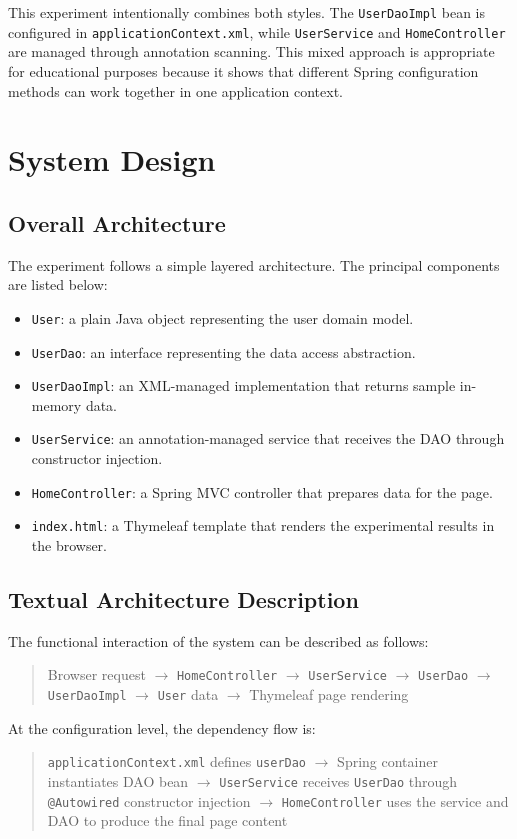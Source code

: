 \documentclass[12pt,a4paper]{article}
\begin{document}
This experiment intentionally combines both styles. The \texttt{UserDaoImpl} bean is configured in \texttt{applicationContext.xml}, while \texttt{UserService} and \texttt{HomeController} are managed through annotation scanning. This mixed approach is appropriate for educational purposes because it shows that different Spring configuration methods can work together in one application context.

\section{System Design}

\subsection{Overall Architecture}
The experiment follows a simple layered architecture. The principal components are listed below:
\begin{itemize}
    \item \texttt{User}: a plain Java object representing the user domain model.
    \item \texttt{UserDao}: an interface representing the data access abstraction.
    \item \texttt{UserDaoImpl}: an XML-managed implementation that returns sample in-memory data.
    \item \texttt{UserService}: an annotation-managed service that receives the DAO through constructor injection.
    \item \texttt{HomeController}: a Spring MVC controller that prepares data for the page.
    \item \texttt{index.html}: a Thymeleaf template that renders the experimental results in the browser.
\end{itemize}

\subsection{Textual Architecture Description}
The functional interaction of the system can be described as follows:
\begin{quote}
Browser request $\rightarrow$ \texttt{HomeController} $\rightarrow$ \texttt{UserService} $\rightarrow$ \texttt{UserDao} $\rightarrow$ \texttt{UserDaoImpl} $\rightarrow$ \texttt{User} data $\rightarrow$ Thymeleaf page rendering
\end{quote}

At the configuration level, the dependency flow is:
\begin{quote}
\texttt{applicationContext.xml} defines \texttt{userDao} $\rightarrow$ Spring container instantiates DAO bean $\rightarrow$ \texttt{UserService} receives \texttt{UserDao} through \texttt{@Autowired} constructor injection $\rightarrow$ \texttt{HomeController} uses the service and DAO to produce the final page content
\end{quote}
\end{document}
